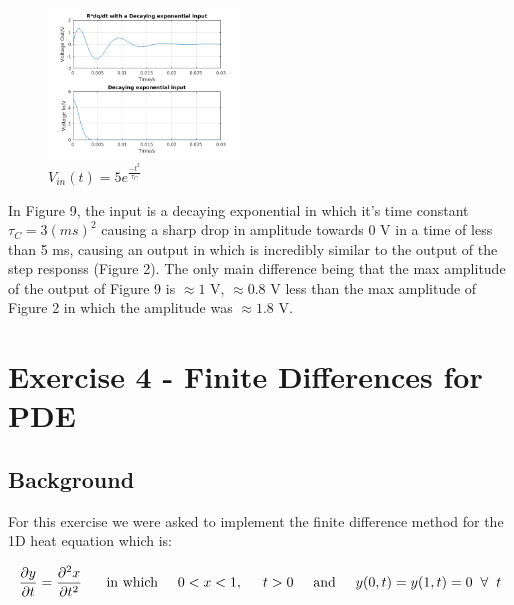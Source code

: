 \documentclass[11pt,a4paper]{article}
\begin{document}
\begin{figure}
    \vspace{-23mm}
  		\includegraphics[width=0.45\textwidth]{Ex3_Figs/DecExp.png}
	\vspace{-6mm}
  	\caption{$V_{in}(t)= 5e^{\frac{-t^2}{\tau_C}}$}
  	\label{fig:ex3g8}
\end{figure}

In Figure 9, the input is a decaying exponential in which it's time constant $\tau_C = 3 (ms)^2$ causing a sharp drop in amplitude towards 0 V in a time of less than 5 ms, causing an output in which is incredibly similar to the output of the step responss (Figure 2). The only main difference being that the max amplitude of the output of Figure 9 is $\approx 1$ V, $\approx 0.8$ V less than the max amplitude of Figure 2 in which the amplitude was $\approx 1.8$ V.

\pagebreak

\section{Exercise 4 - Finite Differences for PDE}\vspace{-1mm}
\subsection{Background}

For this exercise we were asked to implement the finite difference method for the 1D heat equation which is:

\[\frac{\partial y}{\partial t} = \frac{\partial^2 x}{\partial t^2}\ \hspace{5mm} \text{in which} \hspace{5mm} 0 < x < 1, \hspace{5mm} t > 0 \hspace{5mm} \text{and} \hspace{5mm} y(0,t) = y(1,t) = 0 \hspace{2mm} \forall \hspace{2mm} t\]
\end{document}
